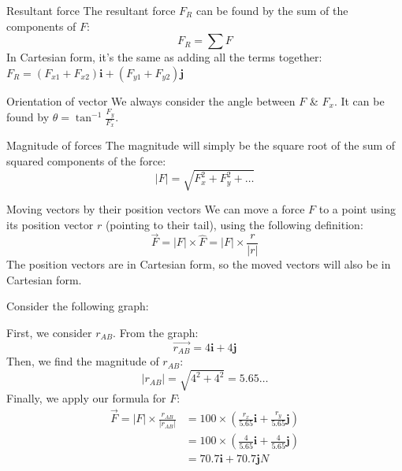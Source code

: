 \documentclass{article}
\begin{document}
\begin{knBox}
    {Resultant force}
    The resultant force $F_R$ can be found by the sum of the components of $F$:
    \[F_R=\sum F\]
    In Cartesian form, it's the same as adding all the terms together: $F_R=(F_{x1}+F_{x2})\boldsymbol{i}+(F_{y1}+F_{y2})\boldsymbol{j}$
\end{knBox}
\begin{knBox}
    {Orientation of vector}
    We always consider the angle between $F$ \& $F_x$. It can be found by $\theta=\tan^{-1}\frac{F_y}{F_x}$.
\end{knBox}
\begin{knBox}
    {Magnitude of forces}
    The magnitude will simply be the square root of the sum of squared components of the force:
    \[|F|=\sqrt{F_x^2+F_y^2+\dots}\]

\end{knBox}
\begin{definition}
    {Moving vectors by their position vectors}
    We can move a force $F$ to a point using its position vector $r$ (pointing to their tail), using the following definition:
    \[\vec{F}=|F|\times\hat{F}=|F|\times\frac{r}{|r|}\]
    The position vectors are in Cartesian form, so the moved vectors will also be in Cartesian form.
    \tcblower
    \begin{center}
        Consider the following graph:
        \begin{figure}[H]
            \centering
        \end{figure}

        First, we consider $r_{AB}$. From the graph:
        \[\vec{r_{AB}}=4\boldsymbol{i}+4\boldsymbol{j}\]
        Then, we find the magnitude of $r_{AB}$:
        \[|r_{AB}|=\sqrt{4^2+4^2}=5.65\dots\]
        Finally, we apply our formula for $F$:
        \begin{align*}
            \vec{F}=|F|\times\frac{r_{AB}}{|r_{AB}|} & =100\times(\frac{r_x}{5.65}\boldsymbol{i}+\frac{r_y}{5.65}\boldsymbol{j}) \\&=100\times(\frac{4}{5.65}\boldsymbol{i}+\frac{4}{5.65}\boldsymbol{j})\\&=70.7\boldsymbol{i}+70.7\boldsymbol{j}N
        \end{align*}
    \end{center}
\end{definition}
\end{document}
